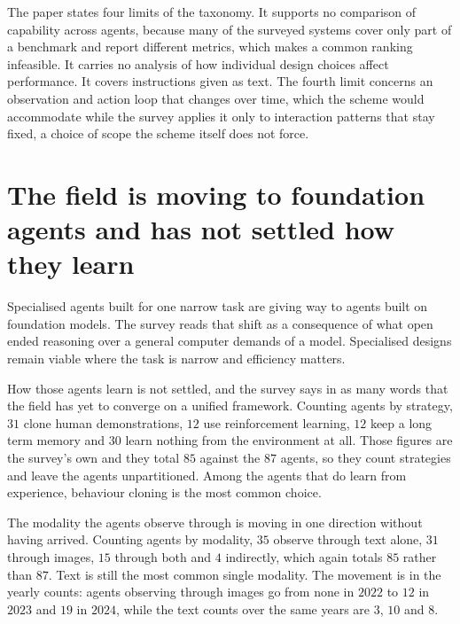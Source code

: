 The paper states four limits of the taxonomy. It supports no comparison of
capability across agents, because many of the surveyed systems cover only part
of a benchmark and report different metrics, which makes a common ranking
infeasible. It carries no analysis of how individual design choices affect
performance. It covers instructions given as text. The fourth limit concerns
an observation and action loop that changes over time, which the scheme would
accommodate while the survey applies it only to interaction patterns that stay
fixed, a choice of scope the scheme itself does not force.

\section{The field is moving to foundation agents and has not settled how they learn}
\label{sec:acu_field}

Specialised agents built for one narrow task are giving way to agents built on
foundation models. The survey reads that shift as a consequence of what open
ended reasoning over a general computer demands of a model. Specialised
designs remain viable where the task is narrow and efficiency matters.

How those agents learn is not settled, and the survey says in as many words
that the field has yet to converge on a unified framework. Counting agents by
strategy, $31$ clone human demonstrations, $12$ use reinforcement learning,
$12$ keep a long term memory and $30$ learn nothing from the environment at
all. Those figures are the survey's own and they total $85$ against the $87$
agents, so they count strategies and leave the agents unpartitioned. Among the
agents that do learn from experience, behaviour cloning is the most common
choice.

The modality the agents observe through is moving in one direction without
having arrived. Counting agents by modality, $35$ observe through text alone, $31$ through
images, $15$ through both and $4$ indirectly, which again totals $85$ rather
than $87$. Text is still the most common single modality. The movement is in the yearly counts: agents observing through
images go from none in $2022$ to $12$ in $2023$ and $19$ in $2024$, while the
text counts over the same years are $3$, $10$ and $8$.

